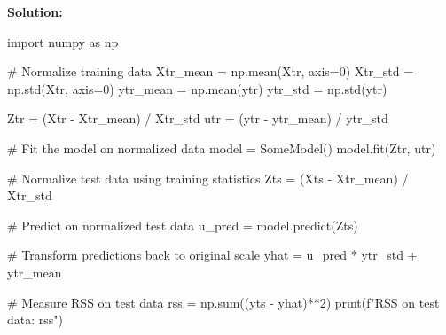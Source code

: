 \documentclass[11pt]{article}
\begin{document}
\begin{enumerate}
\textbf{Solution:}
\begin{python}
import numpy as np

# Normalize training data
Xtr_mean = np.mean(Xtr, axis=0)
Xtr_std = np.std(Xtr, axis=0)
ytr_mean = np.mean(ytr)
ytr_std = np.std(ytr)

Ztr = (Xtr - Xtr_mean) / Xtr_std
utr = (ytr - ytr_mean) / ytr_std

# Fit the model on normalized data
model = SomeModel()
model.fit(Ztr, utr)

# Normalize test data using training statistics
Zts = (Xts - Xtr_mean) / Xtr_std

# Predict on normalized test data
u_pred = model.predict(Zts)

# Transform predictions back to original scale
yhat = u_pred * ytr_std + ytr_mean

# Measure RSS on test data
rss = np.sum((yts - yhat)**2)
print(f"RSS on test data: {rss}")
\end{python}



\end{enumerate}
\end{document}
